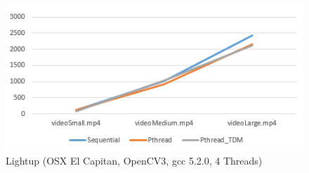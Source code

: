 \documentclass{acm_proc_article-sp}
\begin{document}
\begin{figure}[H]
  \includegraphics[width=\linewidth,natwidth=475,natheight=231]{lightup_osx.png}
  \caption{Lightup (OSX El Capitan, OpenCV3, gcc 5.2.0, 4 Threads)}
  \label{fig:lightup_osx}
\end{figure}
\end{document}
